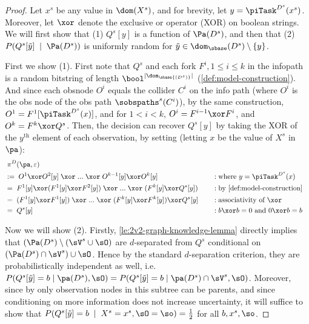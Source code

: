 \begin{proof} 
Let $x^s$ be any value in $\dom(X^s)$, and for brevity, let $y=\piTask^{D^s}(x^s)$. Moreover, let $\xor$ denote the exclusive or operator (XOR) on boolean strings.
We will first show that (1) $Q^s[y]$ is a function of $\Pa(D^s)$, 
and then that (2) $P(Q^s[\tilde y] \; \mid \;\Pa(D^s))$ is uniformly random for $\tilde y \in \dom_{\sbase}(D^s) \setminus \{y\}$. 


First we show (1).
First note that $Q^s$ and each fork $F^i,1\leq i\leq k$ in the infopath is a random bitstring of length $\bool^{|\dom_\sbase{(D^s)}|}$ (\autoref{def:model-construction}). And since each obsnode $O^i$ equals the collider $C^i$ on the info path (where $O^i$ is the obs node of the obs path $\sobspaths^s(C^i)$), by the same construction, $O^1=F^1[\piTask^{D^s}(x)]$, and for $1<i< k$, $O^i=F^{i-1} \xor F^i$, and $O^k=F^k \xor Q^s$.
Then, the decision can recover $Q^s[y]$ by taking the XOR of the $y^{\text{th}}$ element of each observation, by setting (letting $x$ be the value of $X^s$ in $\pa$):~
\begin{alignat*}{2}
    &\;\pi^D(\pa, \varepsilon)\\
    &:= \;O^1 \xor O^2[y]\;\xor\;...\;\xor\; O^{k-1}[y] \xor O^k[y] && \quad : \text{where $y=\piTask^{D^s}(x)$}\\
    &=\; F^1[y] \xor (F^1[y]\xor F^2[y])\;\xor \;... \;\xor\; 
    (F^k[y] \xor Q^s[y]) &&\quad : \text{by \autoref{def:model-construction}} \\
    &=\; (F^1[y] \xor F^1[y] )\;\xor \;... \;\xor\; (F^k[y] \xor F^k[y] )\xor Q^s[y] &&\quad : \text{associativity of $\xor$} \\
    &=\; Q^s[y] &&\quad : \text{$b\xor b=0$ and $0\xor b=b$}
\end{alignat*}




Now we will show (2). Firstly, \autoref{le:2v2-graph-knowledge-lemma} directly implies that $(\Pa(D^s)\setminus (\sV^s\cup \sO)$ are $d$-separated from $Q^s$ conditional on $(\Pa(D^s)\cap \sV^s)\cup \sO$.  Hence by the standard $d$-separation criterion, they are probabilistically independent as well, i.e. $P(Q^s[\tilde{y}]=b \mid \pa(D^s), \sO)=P(Q^s[\tilde{y}]=b \mid \pa(D^s)\cap \sV^s, \sO)$. Moreover, since by
 only observation nodes in this subtree can be parents, and since conditioning on more information does not increase uncertainty, it will suffice to show that
$P(Q^s[\tilde y] = b \; \mid \; X^s=x^s, \sO=\so)= \frac 1 2$ for all $b, x^s, \so$.







\end{proof}
